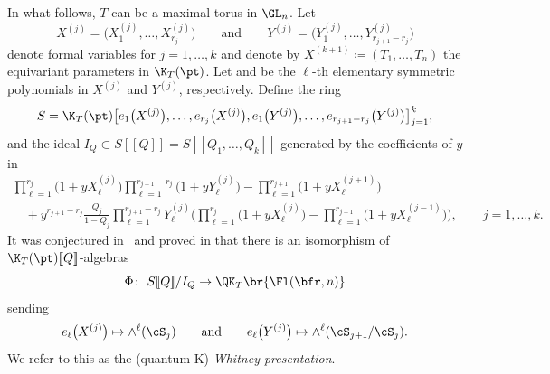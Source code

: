 In what follows, $T$ can be a maximal torus in $\GL_n$.
Let
\[
 {X}^{(j)}=\bigl(X^{(j)}_1,\dots,X^{(j)}_{r_j}\bigr) \qquad\text{and}\qquad {Y}^{(j)}=\bigl(Y^{(j)}_1,\dots,
Y^{(j)}_{r_{j+1}-r_j}\bigr)
\]
denote formal variables for $j=1,\dots,k$ and denote by $X^{(k+1)}\coloneqq (T_1,\dots,T_n)$ the equivariant parameters in $\K_T(\pt)$. Let  and  be the $\ell$-th elementary symmetric polynomials in ${X}^{(j)}$ and ${Y}^{(j)}$, respectively. Define the ring
 \[
 S=\K_T(\pt)\bigl[e_1\bigl(X^{(j)}\bigr),\dots, e_{r_j}\bigl(X^{(j)}\bigr),e_1\bigl(Y^{(j)}\bigr),\dots,e_{r_{j+1}-r_j}\bigl(Y^{(j)}\bigr)\bigr]_{j=1}^k ,
 \]
 and the ideal $I_Q\subset S[\![Q]\!]=S[\![Q_1,\dots,Q_k]\!]$
generated by the coefficients of $y$ in
\begin{gather}\label{eqn:qkrel}
 \prod_{\ell=1}^{r_j}\bigl(1+y X^{(j)}_\ell\bigr)\prod_{\ell=1}^{r_{j+1}-r_j}\bigl(1+y Y^{(j)}_\ell\bigr)-\prod_{\ell=1}^{r_{j+1}}\bigl(1+y X^{(j+1)}_\ell\bigr)\\
 \quad{}+y^{{r_{j+1}-r_j}}\frac{Q_j}{1-Q_j}\prod_{\ell=1}^{r_{j+1}-r_j}Y^{(j)}_\ell\Biggl(\prod_{\ell=1}^{r_j}\bigl(1+yX^{(j)}_\ell\bigr) -\prod_{\ell=1}^{r_{j-1}}\bigl(1+yX^{(j-1)}_\ell\bigr)\Biggr), \qquad j=1,\dots, k. \nonumber
\end{gather}
It was conjectured in~\cite{gu2023quantum,GMSXZZ:QKW} and proved in
\cite{huq2024quantum} that
there is an isomorphism of $\K_T(\pt)[\![Q]\!]$-algebras
 \begin{equation}\label{E:QKWhitney}
 \Phi\colon\ {S[\![Q]\!]}/I_Q\to \QK_T\br{\Fl(\bfr,n)}
 \end{equation}
 sending
 \[ e_\ell\bigl(X^{(j)}\bigr) \mapsto \wedge^\ell(\cS_{j}) \qquad \textrm{and} \qquad e_\ell\bigl(Y^{(j)}\bigr) \mapsto \wedge^\ell(\cS_{{j+1}}/\cS_{j}) . \]
 We refer to this as the (quantum K) {\em Whitney presentation}.

